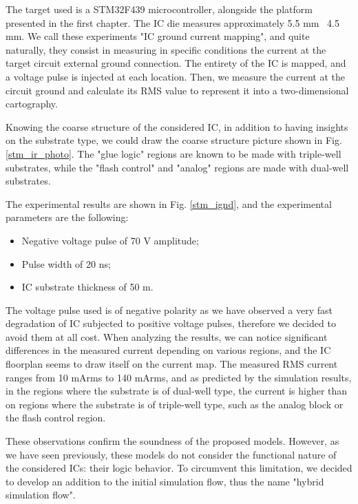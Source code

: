 	The target used is a STM32F439 microcontroller, alongside the platform presented in the first chapter.
	The IC die measures approximately 5.5 mm \texttimes\ 4.5 mm.
	We call these experiments "IC ground current mapping", and quite naturally, they consist in measuring in specific conditions the current at the target circuit external ground connection.
	The entirety of the IC is mapped, and a voltage pulse is injected at each location.
	Then, we measure the current at the circuit ground and calculate its RMS value to represent it into a two-dimensional cartography.
	
	Knowing the coarse structure of the considered IC, in addition to having insights on the substrate type, we could draw the coarse structure picture shown in Fig. \ref{stm_ir_photo}.
	The "glue logic" regions are known to be made with triple-well substrates, while the "flash control" and "analog" regions are made with dual-well substrates.
	
	The experimental results are shown in Fig. \ref{stm_ignd}, and the experimental parameters are the following:
	\begin{itemize}
		\item Negative voltage pulse of 70 V amplitude;
		\item Pulse width of 20 ns;
		\item IC substrate thickness of 50 \textmu m.
	\end{itemize}
	The voltage pulse used is of negative polarity as we have observed a very fast degradation of IC subjected to positive voltage pulses, therefore we decided to avoid them at all cost.
	When analyzing the results, we can notice significant differences in the measured current depending on various regions, and the IC floorplan seems to draw itself on the current map.
	The measured RMS current ranges from 10 mArms to 140 mArms, and as predicted by the simulation results, in the regions where the substrate is of dual-well type, the current is higher than on regions where the substrate is of triple-well type, such as the analog block or the flash control region.
	
	These observations confirm the soundness of the proposed models.
	However, as we have seen previously, these models do not consider the functional nature of the considered ICs: their logic behavior.
	To circumvent this limitation, we decided to develop an addition to the initial simulation flow, thus the name "hybrid simulation flow".